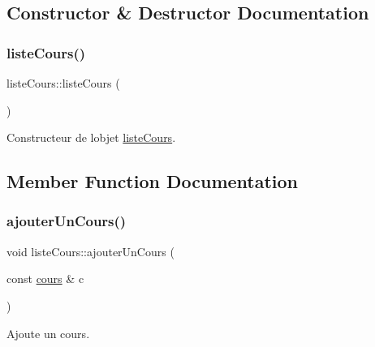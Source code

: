 \subsection{Constructor \& Destructor Documentation}
\hypertarget{classliste_cours_af5a10a6e898373e43355b8a29dc20b83}{}\label{classliste_cours_af5a10a6e898373e43355b8a29dc20b83} 
\subsubsection{\texorpdfstring{liste\+Cours()}{listeCours()}}
{\footnotesize\ttfamily liste\+Cours\+::liste\+Cours (\begin{DoxyParamCaption}{ }\end{DoxyParamCaption})}



Constructeur de l\textquotesingle{}objet \hyperlink{classliste_cours}{liste\+Cours}. 



\subsection{Member Function Documentation}
\hypertarget{classliste_cours_aacc38305cfea76d8cc77d710d144ce8b}{}\label{classliste_cours_aacc38305cfea76d8cc77d710d144ce8b} 
\subsubsection{\texorpdfstring{ajouter\+Un\+Cours()}{ajouterUnCours()}}
{\footnotesize\ttfamily void liste\+Cours\+::ajouter\+Un\+Cours (\begin{DoxyParamCaption}\item[{const \hyperlink{classcours}{cours} \&}]{c }\end{DoxyParamCaption})}



Ajoute un cours. 


